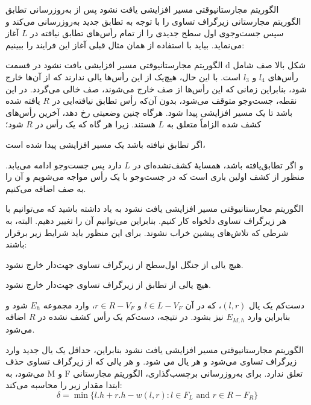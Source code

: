 \begin{itemframe-s}{الگوریتم مجارستانی}{وقتی مسیر افزایشی یافت نشود}
\itm
پس از به‌روزرسانی تطابق الگوریتم مجارستانی زیرگراف تساوی را با توجه به تطابق جدید به‌روزرسانی می‌کند و سپس جست‌وجوی اول سطح جدیدی را از تمام رأس‌های تطابق نیافته در $L$ آغاز می‌نماید. بیاید با استفاده از همان مثال قبلی آغاز این فرایند را ببینیم:
\end{itemframe-s}


\begin{itemframe-s}{الگوریتم مجارستانی}{وقتی مسیر افزایشی یافت نشود}
\itm
در قسمت d شکل بالا صف شامل رأس‌های
$l_4$ و
$l_3$
است. با این حال، هیچ‌یک از این رأس‌ها یالی ندارند که از آن‌ها خارج شود، بنابراین زمانی که این رأس‌ها از صف خارج می‌شوند، صف خالی می‌گردد. در این نقطه، جست‌وجو متوقف می‌شود، بدون آن‌که رأس تطابق نیافته‌ایی در $R$ یافته شده باشد تا یک مسیر افزایشی پیدا شود.
\itm
هرگاه چنین وضعیتی رخ دهد، آخرین رأس‌های کشف شده
الزاماً متعلق به $L$ هستند. زیرا هر گاه که یک رأس در $R$ شود؛
\item[1]
اگر تطابق نیافته باشد یک مسیر افزایشی پیدا شده است،
\item[2]
و اگر تطابق‌یافته باشد، همسایه‌ٔ کشف‌نشده‌ای در $L$ دارد پس جست‌وجو ادامه می‌یابد.
\itm
منظور از کشف اولین باری است که در جست‌وجو با یک رأس مواجه می‌شویم و آن را به صف اضافه می‌کنیم.
\end{itemframe-s}


\begin{itemframe-s}{الگوریتم مجارستانی}{وقتی مسیر افزایشی یافت نشود}
\itm
به یاد داشته باشید که می‌توانیم با هر زیرگراف تساوی دلخواه کار کنیم. بنابراین می‌توانیم آن را تغییر دهیم. البته، به شرطی که تلاش‌های پیشین خراب نشوند. برای این منظور باید شرایط زیر برقرار باشند:
\item[1]
هیچ یالی از جنگل اول‌سطح از زیرگراف تساوی جهت‌دار خارج نشود.
\item[2]
هیچ یالی از تطابق از زیرگراف تساوی جهت‌دار خارج نشود.
\item[3]
دست‌کم یک یال $(l, r)$، که در آن
$l \in L - V_F$
 و
$r \in R - V_F$،
وارد مجموعه $E_h$ شود و بنابراین وارد $E_{M,h}$ نیز بشود. در نتیجه، دست‌کم یک رأس کشف نشده در $R$ اضافه می‌شود.
\end{itemframe-s}


\begin{itemframe-s}{الگوریتم مجارستانی}{وقتی مسیر افزایشی یافت نشود}
\itm
بنابراین، حداقل یک یال جدید وارد زیرگراف تساوی می‌شود و هر یال می شود.
و هر یالی که از زیرگراف تساوی حذف می‌شود، به M و F تعلق ندارد.
\itm
برای به‌روزرسانی برچسب‌گذاری، الگوریتم مجارستانی ابتدا مقدار زیر را محاسبه می‌کند:
$$
\delta = \min \{ l.h + r.h - w(l, r) : l \in F_L \text{ and } r \in R - F_R \}
$$

\end{itemframe-s}


